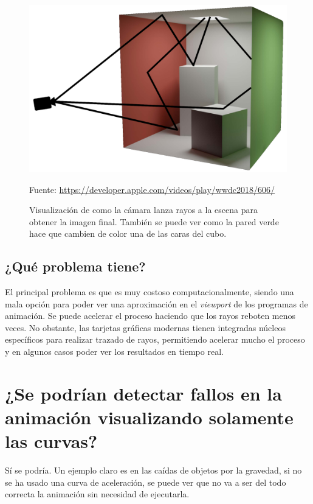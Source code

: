 \documentclass{article}
\begin{document}
\begin{figure}[H]
    \centering
    \includegraphics[width=\textwidth]{imagenes/raytracingapple.png}
    \caption{Visualización de como la cámara lanza rayos a la escena para obtener la imagen final. También se puede ver como la pared verde hace que cambien de color una de las caras del cubo.}
   \vspace{10pt}
   \footnotesize{Fuente: \url{https://developer.apple.com/videos/play/wwdc2018/606/}}    
 \end{figure}
\subsection{¿Qué problema tiene?}

El principal problema es que es muy costoso computacionalmente, siendo una mala opción para poder ver una aproximación en el \textit{viewport} de los programas de animación. Se puede acelerar el proceso haciendo que los rayos reboten menos veces. No obstante, las tarjetas gráficas modernas tienen integradas núcleos específicos para realizar trazado de rayos, permitiendo acelerar mucho el proceso y en algunos casos poder ver los resultados en tiempo real.


\section{¿Se podrían detectar fallos en la animación visualizando solamente las curvas?}

Sí se podría. Un ejemplo claro es en las caídas de objetos por la gravedad, si no se ha usado una curva de aceleración, se puede ver que no va a ser del todo correcta la animación sin necesidad de ejecutarla.
\end{document}
